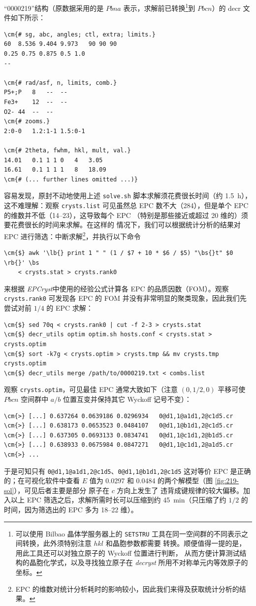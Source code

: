 “0000219”结构（原数据采用的是 $Pbna$ 表示，求解前已转换\footnote{%
	可以使用 Bilbao 晶体学服务器\parencite{aroyo2006}上的 \texttt{SETSTRU}
	工具在同一空间群的不同表示之间转换，此外须特别注意 $hkl$ 和晶胞参数都需要
	转换。顺便值得一提的是，用此工具还可以对独立原子的 Wyckoff 位置进行判断，
	从而方便计算测试结构的晶胞化学式，以及寻找独立原子在 \emph{decryst}
	所用不对称单元内等效原子的坐标。%
}到 $Pbcn$）的 decr 文件如下所示：
\begin{Verbatim}
\cm{# sg, abc, angles; ctl, extra; limits.}
60	8.536 9.404 9.973	90 90 90
0.25 0.75 0.875	0.5 1.0
--

\cm{# rad/asf, n, limits, comb.}
P5+;P	8	--	--
Fe3+	12	--	--
O2-	44	--	--
\cm{# zooms.}
2:0-0	1.2:1-1	1.5:0-1

\cm{# 2theta, fwhm, hkl, mult, val.}
14.01	0.1	1 1 0	4	3.05
16.61	0.1	1 1 1	8	18.09
\cm{# (... further lines omitted ...)}
\end{Verbatim}
容易发现，原封不动地使用上述 \verb|solve.sh| 脚本求解须花费很长时间（约
\SI{1.5}{\hour}），这不难理解：观察 \verb|crysts.list| 可见虽然总 EPC
数不大（284），但是单个 EPC 的维数并不低（14--23），这导致每个 EPC
（特别是那些接近或超过 20 维的）须要花费很长的时间来求解。在这样的
情况下，我们可以根据统计分析的结果对 EPC 进行筛选：中断求解\footnote{%
	EPC 的维数对统计分析耗时的影响较小，因此我们来得及获取统计分析的结果。%
}，并执行以下命令
\begin{Verbatim}
\cm{$} awk '\lb{} print 1 " " (1 / $7 + 10 * $6 / $5) "\bs{}t" $0 \rb{}' \bs
	< crysts.stat > crysts.rank0
\end{Verbatim}
来根据 \emph{EPCryst}\parencite{deng2011}中使用的经验公式计算各 EPC
的品质因数（FOM）。观察 \verb|crysts.rank0| 可发现各 EPC 的 FOM
并没有非常明显的聚类现象，因此我们先尝试对前 $1/4$ 的 EPC 求解：
\begin{Verbatim}
\cm{$} sed 70q < crysts.rank0 | cut -f 2-3 > crysts.stat
\cm{$} decr_utils optim optim.sh hosts.conf < crysts.stat > crysts.optim
\cm{$} sort -k7g < crysts.optim > crysts.tmp && mv crysts.tmp crysts.optim
\cm{$} decr_utils merge /path/to/0000219.txt < combs.list
\end{Verbatim}
观察 \verb|crysts.optim|，可见最佳 EPC 通常大致如下（注意 $(0, 1/2, 0)$
平移可使 $Pbcn$ 空间群中 $a/b$ 位置互变并保持其它 Wyckoff 记号不变）：
\begin{Verbatim}
\cm{>} [...] 0.637264 0.0639186 0.0296934	0@d1,1@a1d1,2@c1d5.cr
\cm{>} [...] 0.638173 0.0653523 0.0484107	0@d1,1@b1d1,2@c1d5.cr
\cm{>} [...] 0.637305 0.0693133 0.0834741	0@d1,1@c1d1,2@b1d5.cr
\cm{>} [...] 0.638933 0.0675984 0.0847271	0@d1,1@c1d1,2@a1d5.cr
\cm{>} ...
\end{Verbatim}
于是可知只有 \verb|0@d1,1@a1d1,2@c1d5|、\verb|0@d1,1@b1d1,2@c1d5| 这对等价
EPC 是正确的；在可视化软件中查看 $E$ 值为 0.0297 和 0.0484 的两个解模型（图
\ref{fig:219-sol}），可见后者主要是部分  原子在 $c$ 方向上发生了
违背成键规律的较大偏移。加入以上 EPC 筛选之后，求解所需时长可以压缩到约
\SI{45}{\minute}（只压缩了约 $1/2$ 的时间，因为筛选出的 EPC 多为 18--22 维）。

